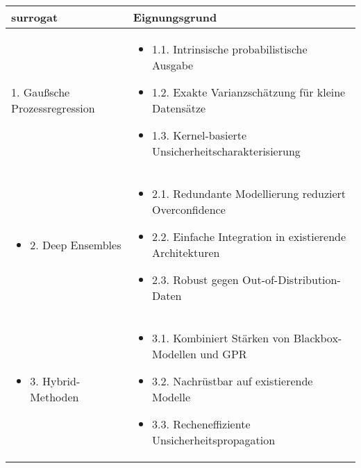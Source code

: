 \begin{otherlanguage}{ngerman}
\begin{table}[!htpb]
  \centering
  \footnotesize
  \begin{tabularx}{\textwidth}{|l|X|}
    \hline
    \textbf{\gls{surrogat}} & \textbf{Eignungsgrund} \\
    \hline
    \begin{pseudoitemize}
      \item 1. \gls{Gaußsche Prozessregression}
    \end{pseudoitemize} &  
    \begin{itemize}[topsep=0em, itemsep=0em, leftmargin=0em, labelsep=0.25em]
      \item 1.1. Intrinsische probabilistische Ausgabe
      \item 1.2. Exakte Varianzschätzung für kleine Datensätze
      \item 1.3. Kernel-basierte Unsicherheitscharakterisierung
    \end{itemize} \\ 
    \hline
    \begin{itemize}[topsep=0em, itemsep=0em, leftmargin=0em, labelsep=0.25em]
      \item 2. Deep Ensembles
    \end{itemize} & 
    \begin{itemize}[topsep=0em, itemsep=0em, leftmargin=0em, labelsep=0.25em]
      \item 2.1. Redundante Modellierung reduziert Overconfidence
      \item 2.2. Einfache Integration in existierende Architekturen
      \item 2.3. Robust gegen Out-of-Distribution-Daten
    \end{itemize} \\
    \hline
    \begin{itemize}[topsep=0em, itemsep=0em, leftmargin=0em, labelsep=0.25em]
      \item 3. Hybrid-Methoden
    \end{itemize} & 
    \begin{itemize}[topsep=0em, itemsep=0em, leftmargin=0em, labelsep=0.25em]
      \item 3.1. Kombiniert Stärken von Blackbox-Modellen und GPR
      \item 3.2. Nachrüstbar auf existierende Modelle
      \item 3.3. Recheneffiziente Unsicherheitspropagation
    \end{itemize} \\
    \hline

\end{tabularx}
\end{table}
\end{otherlanguage}
